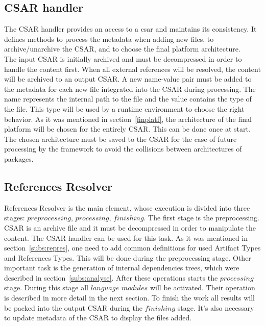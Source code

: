 \subsection{CSAR handler} \label{subs:casr_h}
The CSAR handler provides an access to a \gls{csar} and maintains its consistency. 
It defines methods to process the metadata when adding new files, to \mbox{archive/unarchive} the CSAR, and to choose the final platform architecture. \\
The input CSAR is initially archived and must be decompressed in order to handle the content first.
When all external references will be resolved, the content will be archived to an output CSAR.
A new name-value pair must be added to the metadata for each new file integrated into the CSAR during processing. 
The name represents the internal path to the file and the value contains the type of the file. 
This type will be used by a runtime environment to choose the right behavior. %
As it was mentioned in section~\ref{finplatf}, the architecture of the final platform will be chosen for the entirely CSAR.
This can be done once at start.
The chosen architecture must be saved to the CSAR for the case of future processing by the framework to avoid the collisions between architectures of packages.

\subsection{References Resolver} \label{subs:RR}
References Resolver is the main element, whose execution is divided into three stages: $preprocessing$, $processing$, $finishing$. %
The first stage is the preprocessing.
CSAR is an archive file and it must be decompressed in order to manipulate the content. 
The CSAR handler can be used for this task.
As it was mentioned in section~\ref{subs:repres}, one need to add common definitions for used Artifact Types and References Types.
This will be done during the preprocessing stage.
Other important task is the generation of internal dependencies trees, which were described in section~\ref{subs:analyse}.
After these operations starts the $processing$ stage.
During this stage all $language$ $modules$ will be activated.
Their operation is described in more detail in the next section. %
To finish the work all results will be packed into the output CSAR during the $finishing$ stage.
It's also necessary to update metadata of the CSAR to display the files added.
%

